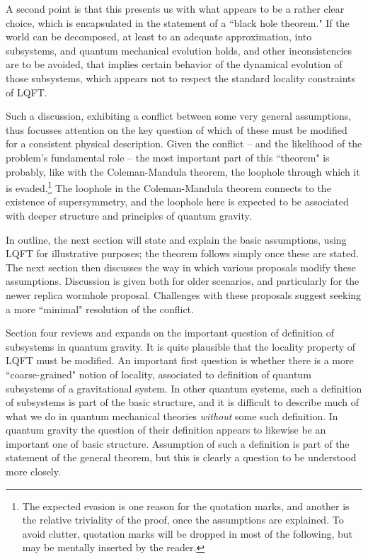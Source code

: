 \documentclass[11pt]{article}
\numberwithin{equation}{section}
\begin{document}
A second point is that this presents us with what appears to be a rather clear choice, which is encapsulated in the statement of a ``black hole theorem."  If the world can be decomposed, at least to an adequate approximation, into subsystems, and quantum mechanical evolution holds, and other inconsistencies are to be avoided, that implies certain behavior of the dynamical evolution of those subsystems, which appears not to respect the standard locality constraints of LQFT.

Such a discussion, exhibiting a conflict between some very general assumptions, thus focusses attention on the key question of which of these must be modified for a consistent physical description.  Given the conflict -- and the likelihood of the problem's fundamental role -- the most important part of this ``theorem" is probably, like with the Coleman-Mandula theorem\cite{CoMa}, the loophole through which it is evaded.\footnote{The expected evasion   is one reason for the quotation marks, and another is the relative triviality of the proof, once the assumptions are explained.  To avoid clutter,  quotation marks will be dropped in most of the following, but may be mentally inserted by the reader.}  The loophole in the Coleman-Mandula theorem connects to the existence of supersymmetry, and the loophole here is expected to be associated with  deeper structure and principles of quantum gravity.  

In outline, the next section will state and explain the basic assumptions, using LQFT for illustrative purposes; the theorem follows simply once these are stated.  The next section then discusses the way in which various proposals modify these assumptions. Discussion is given both for older scenarios, and particularly for the newer replica wormhole proposal.  Challenges with these proposals suggest seeking a more ``minimal" resolution of the conflict.

Section four reviews and expands on the important question of definition of subsystems in quantum gravity.  It is quite plausible that the locality property of LQFT must be modified.   An important first question is whether there is a more ``coarse-grained" notion of locality, associated to definition of quantum subsystems of a gravitational system.  In other quantum systems, such a definition of subsystems is part of the basic structure, and it is difficult to describe much of what we do in quantum mechanical theories {\it without} some such definition.  In quantum gravity the question of their definition appears to likewise be an important one of basic structure.  Assumption of such a definition is part of the statement of the general theorem, but this is clearly a question to be understood more closely. 
\end{document}
